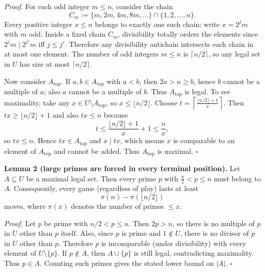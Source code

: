 \noindent\emph{Proof.}
For each odd integer $m\le n$, consider the chain
\[
C_m:=\{m,2m,4m,8m,\dots\}\cap\{1,2,\dots,n\}.
\]
Every positive integer $x\le n$ belongs to exactly one such chain: write $x=2^j m$ with $m$ odd.
Inside a fixed chain $C_m$, divisibility totally orders the elements since $2^j m\mid 2^{j'}m$ iff $j\le j'$.
Therefore any divisibility antichain intersects each chain in at most one element.
The number of odd integers $m\le n$ is $\lceil n/2\rceil$, so any legal set in $U$ has size at most $\lceil n/2\rceil$.

Now consider $A_\mathrm{top}$. If $a,b\in A_\mathrm{top}$ with $a<b$, then $2a>n\ge b$, hence $b$ cannot be a multiple of $a$; also $a$ cannot be a multiple of $b$. Thus $A_\mathrm{top}$ is legal.
To see maximality, take any $x\in U\setminus A_\mathrm{top}$, so $x\le \lfloor n/2\rfloor$.
Choose $t=\left\lceil\frac{\lfloor n/2\rfloor+1}{x}\right\rceil$. Then $tx\ge \lfloor n/2\rfloor+1$ and also $tx\le n$ because
\[
 t\le \frac{\lfloor n/2\rfloor+1}{x}+1\le \frac{n}{x},
\]
so $tx\le n$.
Hence $tx\in A_\mathrm{top}$ and $x\mid tx$, which means $x$ is comparable to an element of $A_\mathrm{top}$ and cannot be added.
Thus $A_\mathrm{top}$ is maximal.
\hfill$\square$

\medskip
\noindent\textbf{Lemma 2 (large primes are forced in every terminal position).}
Let $A\subseteq U$ be a maximal legal set. Then every prime $p$ with $\frac n2<p\le n$ must belong to $A$.
Consequently, every game (regardless of play) lasts at least
\[
\pi(n)-\pi(\lfloor n/2\rfloor)
\]
moves, where $\pi(x)$ denotes the number of primes $\le x$.

\noindent\emph{Proof.}
Let $p$ be prime with $n/2<p\le n$. Then $2p>n$, so there is no multiple of $p$ in $U$ other than $p$ itself.
Also, since $p$ is prime and $1\notin U$, there is no divisor of $p$ in $U$ other than $p$.
Therefore $p$ is incomparable (under divisibility) with every element of $U\setminus\{p\}$.
If $p\notin A$, then $A\cup\{p\}$ is still legal, contradicting maximality.
Thus $p\in A$.
Counting such primes gives the stated lower bound on $|A|$.
\hfill$\square$

